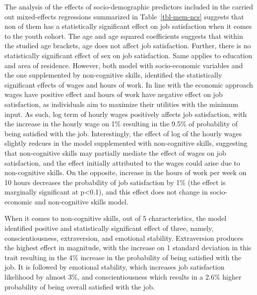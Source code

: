 \documentclass[
]{interact}
\begin{document}
The analysis of the effects of socio-demographic predictors included in
the carried out mixed-effects regressions summarized in
Table~\ref{tbl-mem-ncs} suggests that non of them has a statistically
significant effect on job satisfaction when it comes to the youth
cohort. The age and age squared coefficients suggests that within the
studied age brackets, age does not affect job satisfaction. Further,
there is no statistically significant effect of sex on job satisfaction.
Same applies to education and area of residence. However, both model
with socio-economic variables and the one supplemented by non-cognitive
skills, identified the statistically significant effects of wages and
hours of work. In line with the economic approach wages have positive
effect and hours of work have negative effect on job satisfaction, as
individuals aim to maximize their utilities with the minimum input. As
such, log term of hourly wages positively affects job satisfaction, with
the increase in the hourly wage on 1\% resulting in the 9.5\% of
probability of being satisfied with the job. Interestingly, the effect
of log of the hourly wages slightly redcues in the model supplemented
with non-cognitive skills, suggesting that non-cognitive skills may
partially mediate the effect of wages on job satisfaction, and the
effect initially attributed to the wages could arise due to
non-cognitive skills. On the opposite, increase in the hours of work per
week on 10 hours decreases the probability of job satisfaction by 1\%
(the effect is marginally significant at p\textless0.1), and this effect
does not change in socio-economic and non-cognitive skills model.

When it comes to non-cognitive skills, out of 5 characteristics, the
model identified positive and statistically significant effect of three,
namely, conscientiousness, extraversion, and emotional stability.
Extraversion produces the highest effect in magnitude, with the increase
on 1 standard deviation in this trait resulting in the 4\% increase in
the probability of being satisfied with the job. It is followed by
emotional stability, which increases job satisfaction likelihood by
almost 3\%, and conscientiousness which results in a 2.6\% higher
probability of being overall satisfied with the job.
\end{document}
